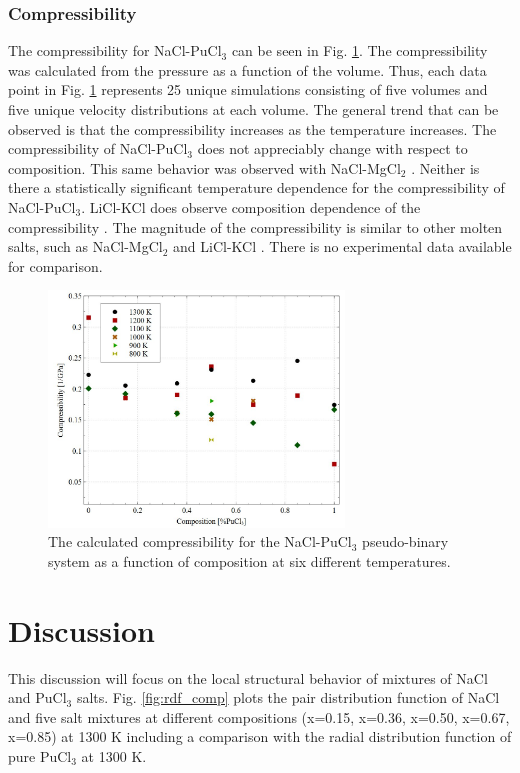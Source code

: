 \documentclass[review]{elsarticle}
\begin{document}
\subsubsection{Compressibility}
The compressibility for NaCl-PuCl$_3$ can be seen in Fig. \ref{fig:compressibility}. The compressibility was calculated from the pressure as a function of the volume. Thus, each data point in Fig. \ref{fig:compressibility} represents 25 unique simulations consisting of five volumes and five unique velocity distributions at each volume. The general trend that can be observed is that the compressibility increases as the temperature increases. The compressibility of NaCl-PuCl$_3$ does not appreciably change with respect to composition. This same behavior was observed with NaCl-MgCl$_2$ \cite{duemmler_naclmgcl}. Neither is there a statistically significant temperature dependence for the compressibility of NaCl-PuCl$_3$. LiCl-KCl does observe composition dependence of the compressibility \cite{duemmler_liclkcl, Bengston2014}. The magnitude of the compressibility is similar to other molten salts, such as NaCl-MgCl$_2$ \cite{duemmler_naclmgcl} and LiCl-KCl \cite{duemmler_liclkcl, Bengston2014}. There is no experimental data available for comparison. 
\begin{figure}[h!]
 \centering
 \includegraphics[width=0.7\textwidth]{compressibility_no_fits.jpg} 
 \caption{The calculated compressibility for the NaCl-PuCl$_3$ pseudo-binary system as a function of composition at six different temperatures.}
 \label{fig:compressibility}
\end{figure} 
\FloatBarrier

\section{Discussion}
This discussion will focus on the local structural behavior of mixtures of NaCl and PuCl$_3$ salts. Fig. \ref{fig:rdf_comp} plots the pair distribution function of NaCl and five salt mixtures at different compositions (x=0.15, x=0.36, x=0.50, x=0.67, x=0.85) at 1300 K including a comparison with the radial distribution function of pure PuCl$_3$ at 1300 K.
\end{document}
